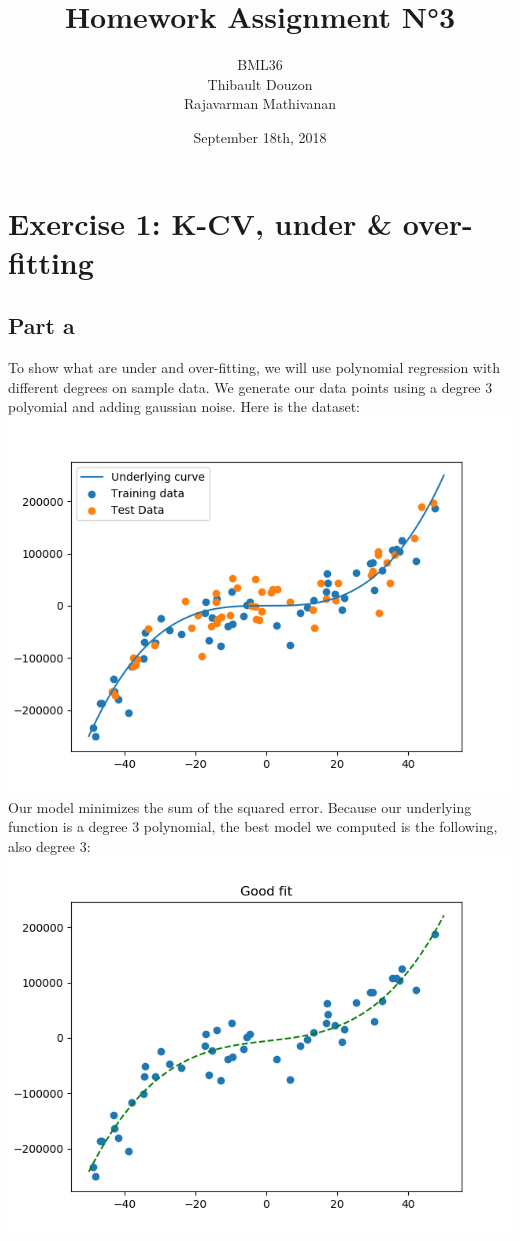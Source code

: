\documentclass[a4paper, 10pt]{article}
\title{Homework Assignment N°3}
\author{BML36\\Thibault Douzon\\Rajavarman Mathivanan}
\date{September 18th, 2018}
\begin{document}
\maketitle

\pagebreak

\tableofcontents

\pagebreak

\section{Exercise 1: K-CV, under \& over-fitting}

\subsection{Part a}
To show what are under and over-fitting, we will use polynomial 
regression with different degrees on sample data. We generate 
our data points using a degree 3 polyomial and adding gaussian noise. Here is the dataset:
\\
\includegraphics{ex1a_curve}
\\
Our model minimizes the sum of the squared error. Because our underlying function is a degree 3
polynomial, the best model we computed is the following, also degree 3:
\\
\includegraphics{ex1a_good}
\end{document}
